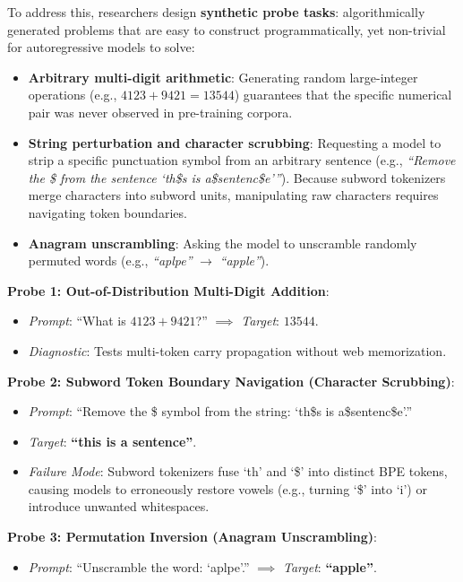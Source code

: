 \documentclass[../../../main.tex]{subfiles}
\begin{document}
To address this, researchers design \textbf{synthetic probe tasks}: algorithmically generated problems that are easy to construct programmatically, yet non-trivial for autoregressive models to solve:
\begin{itemize}
    \item \textbf{Arbitrary multi-digit arithmetic}: Generating random large-integer operations (e.g., $4123 + 9421 = 13544$) guarantees that the specific numerical pair was never observed in pre-training corpora.
    \item \textbf{String perturbation and character scrubbing}: Requesting a model to strip a specific punctuation symbol from an arbitrary sentence (e.g., \textit{``Remove the \$ from the sentence `th\$s is a\$sentenc\$e'''}). Because subword tokenizers merge characters into subword units, manipulating raw characters requires navigating token boundaries.
    \item \textbf{Anagram unscrambling}: Asking the model to unscramble randomly permuted words (e.g., \textit{``aplpe''} $\to$ \textit{``apple''}).
\end{itemize}

\begin{center}
\begin{minipage}{0.95\textwidth}
\begin{tcolorbox}[colback=cardBg,colframe=cardLine,arc=2pt,boxrule=0.5pt,title=\textbf{Task Example: Synthetic Diagnostic Probes}]
\small\sffamily
\textbf{Probe 1: Out-of-Distribution Multi-Digit Addition}:
\begin{itemize}[leftmargin=1.5em,itemsep=1pt]
    \item \textit{Prompt}: ``What is $4123 + 9421$?'' $\implies$ \textit{Target}: \textbf{$13544$}.
    \item \textit{Diagnostic}: Tests multi-token carry propagation without web memorization.
\end{itemize}
\textbf{Probe 2: Subword Token Boundary Navigation (Character Scrubbing)}:
\begin{itemize}[leftmargin=1.5em,itemsep=1pt]
    \item \textit{Prompt}: ``Remove the \$ symbol from the string: `th\$s is a\$sentenc\$e'.''
    \item \textit{Target}: \textbf{``this is a sentence''}.
    \item \textit{Failure Mode}: Subword tokenizers fuse `th' and `\$' into distinct BPE tokens, causing models to erroneously restore vowels (e.g., turning `\$' into `i') or introduce unwanted whitespaces.
\end{itemize}
\textbf{Probe 3: Permutation Inversion (Anagram Unscrambling)}:
\begin{itemize}[leftmargin=1.5em,itemsep=1pt]
    \item \textit{Prompt}: ``Unscramble the word: `aplpe'.'' $\implies$ \textit{Target}: \textbf{``apple''}.
\end{itemize}
\end{tcolorbox}
\end{minipage}
\end{center}
\end{document}
